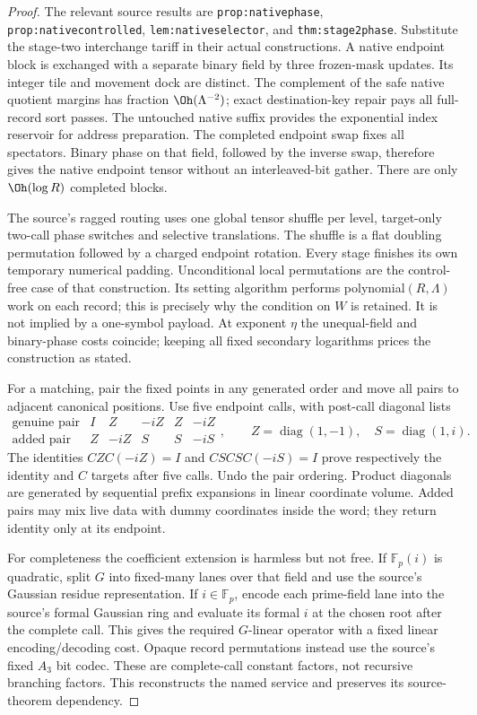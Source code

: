 \begin{proof}
The relevant source results are \texttt{prop:nativephase},
\texttt{prop:nativecontrolled}, \texttt{lem:nativeselector}, and
\texttt{thm:stage2phase}. Substitute the stage-two interchange tariff
in their actual constructions. A native endpoint block is exchanged
with a separate binary field by three frozen-mask updates. Its integer
tile and movement dock are distinct. The complement of the safe native
quotient margins has fraction $\Oh(\Lambda^{-2})$; exact destination-key
repair pays all full-record sort passes. The untouched native suffix
provides the exponential index reservoir for address preparation.
The completed endpoint swap fixes all spectators. Binary phase on that
field, followed by the inverse swap, therefore gives the native endpoint
tensor without an interleaved-bit gather. There are only
$\Oh(\log R)$ completed blocks.

The source's ragged routing uses one global tensor shuffle per level,
target-only two-call phase switches and selective translations. The
shuffle is a flat doubling permutation followed by a charged endpoint
rotation. Every stage finishes its own temporary numerical padding.
Unconditional local permutations are the control-free case of that
construction. Its setting algorithm performs polynomial$(R,\Lambda)$
work on each record; this is precisely why the condition on $W$ is
retained. It is not implied by a one-symbol payload.
At exponent $\eta$ the unequal-field and binary-phase costs coincide;
keeping all fixed secondary logarithms prices the construction as stated.

For a matching, pair the fixed points in any generated order and move
all pairs to adjacent canonical positions. Use five endpoint calls,
with post-call diagonal lists
\[
 \begin{array}{c|ccccc}
 \text{genuine pair}&I&Z&-iZ&Z&-iZ\\
 \text{added pair}&Z&-iZ&S&S&-iS
 \end{array},\qquad Z=\operatorname{diag}(1,-1),\quad
 S=\operatorname{diag}(1,i).
\]
The identities $CZC(-iZ)=I$ and $CSCSC(-iS)=I$ prove respectively
the identity and $C$ targets after five calls. Undo the pair ordering.
Product diagonals are generated by sequential prefix expansions in
linear coordinate volume. Added pairs may mix live data with dummy
coordinates inside the word; they return identity only at its endpoint.

For completeness the coefficient extension is harmless but not free.
If $\mathbb F_p(i)$ is quadratic, split $G$ into fixed-many lanes over
that field and use the source's Gaussian residue representation.
If $i\in\mathbb F_p$, encode each prime-field lane into the source's
formal Gaussian ring and evaluate its formal $i$ at the chosen root
after the complete call. This gives the required $G$-linear operator
with a fixed linear encoding/decoding cost. Opaque record permutations
instead use the source's fixed $A_3$ bit codec. These are complete-call
constant factors, not recursive branching factors. This reconstructs
the named service and preserves its source-theorem dependency.
\end{proof}

